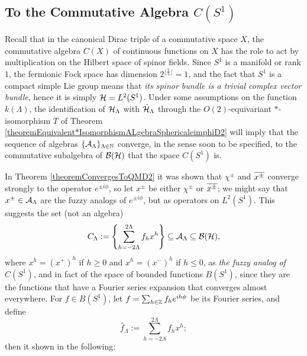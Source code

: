 
\subsection{To the Commutative Algebra $C(S^1)$}

Recall that in the canonical Dirac triple of a commutative space $X$, the commutative algebra $C(X)$ of continuous functions on $X$ has the role to act by multiplication on the Hilbert space of spinor fields. Since $S^1$ is a manifold or rank $1$, the fermionic Fock space has dimension $2^{\lfloor \frac{1}{2}\rfloor} = 1$, and the fact that $S^1$ is a compact simple Lie group means that \emph{its spinor bundle is a trivial complex vector bundle}, hence it is simply $\mathcal H = L^2(S^1)$. Under some assumptions on the function $k(\Lambda)$, the identification of $\mathcal H_\Lambda$ with $\tilde {\mathcal H}_\Lambda$ through the $O(2)$-equivariant $*$-isomorphism $T$ of Theorem \ref{theoremEquivalent*IsomorphismALgebraSphericaleimphiD2} will imply that the sequence of algebras $\{\mathcal A_\Lambda\}_{\Lambda \in \mathbb{N}}$ converge, in the sense soon to be specified, to the commutative subalgebra of $\mathcal B(\mathcal H)$ that the space $C(S^1)$ is.

In Theorem \ref{theoremConvergesToQMD2} it was shown that $\chi^\pm$ and $\overline{x^\pm}$ converge strongly to the operator $e^{\pm i\phi}$, so let $x^\pm$ be either $\chi^\pm$ or $\overline{x^\pm}$; we might say that $x^\pm \in \mathcal A_\Lambda$ are the fuzzy analogs of $e^{\pm i\phi}$, but as operators on $L^2(S^1)$. This suggests \cite{Fiore2018} the set (not an algebra)
\begin{equation}
    C_\Lambda := \left\{ \sum_{h = -2\Lambda}^{2\Lambda} f_h x^h \right\} \subseteq \mathcal A_\Lambda \subseteq \mathcal B(\mathcal H),
\end{equation}
where $x^h = (x^+)^h$ if $h \geq 0$ and $x^h = (x^-)^h$ if $h \leq 0$, as \emph{the fuzzy analog of $C(S^1)$}, and in fact of the space of bounded functions $B(S^1)$, since they are the functions that have a Fourier series expansion that converges almost everywhere. For $f \in B(S^1)$, let $f = \sum_{h \in \ZZ} f_h e^{ih\phi}$ be its Fourier series, and define
\begin{equation}
    \hat f_\Lambda := \sum_{h = -2\Lambda}^{2\Lambda} f_h x^h;
\end{equation}
then it shown in \cite{Fiore2018} the following:

